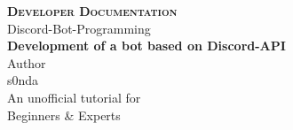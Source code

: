 %
%
\begin{center}
  {\Huge {\bfseries\scshape Developer Documentation}}\\
  \vspace*{2.cm}
  {\Large Discord-Bot-Programming}\linebreak\\
  {\huge {\bfseries Development of a bot based on Discord-API}}\\
  \vspace*{2.75cm}
  {\LARGE Author}\linebreak\\
  {\Large s0nda}\\
  \vspace*{2.75cm}
  {\Large An unofficial tutorial for}\linebreak\\
  {\LARGE Beginners \& Experts}
\end{center}
\vspace*{5.cm}

\begin{minipage}[b]{1.\textwidth}
% 
\end{minipage}

% 

\clearpage
